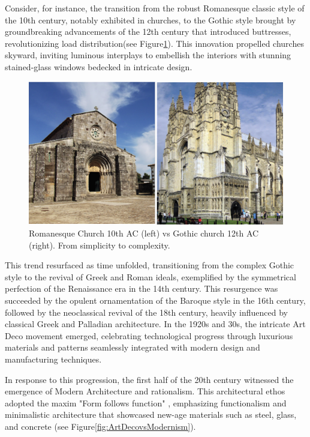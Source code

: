 Consider, for instance, the transition from the robust Romanesque classic style of the 10th century, notably exhibited in churches, to the Gothic style brought by groundbreaking advancements of the 12th century that introduced buttresses, revolutionizing load distribution\cite{Arora2023}(see Figure\ref{fig:RomanesquevsGothic}).
This innovation propelled churches skyward, inviting luminous interplays to embellish the interiors with stunning stained-glass windows bedecked in intricate design\cite{Stacbond2020}.

     \begin{figure}[htb]
          \centering
          \includegraphics[width= \linewidth]{Images/RomanesqueVsGothic}
          \caption{Romanesque Church 10th AC (left) vs Gothic church 12th AC (right). From simplicity to complexity.}
          \label{fig:RomanesquevsGothic}
        \end{figure}

This trend resurfaced as time unfolded, transitioning from the complex Gothic style to the revival of Greek and Roman ideals, exemplified by the symmetrical perfection of the Renaissance era in the 14th century. This resurgence was succeeded by the opulent ornamentation of the Baroque style in the 16th century, followed by the neoclassical revival of the 18th century, heavily influenced by classical Greek and Palladian architecture. In the 1920s and 30s, the intricate Art Deco movement emerged, celebrating technological progress through luxurious materials and patterns seamlessly integrated with modern design and manufacturing techniques.

In response to this progression, the first half of the 20th century witnessed the emergence of Modern Architecture and rationalism. This architectural ethos adopted the maxim "Form follows function" \cite{Gage2015}, emphasizing functionalism and minimalistic architecture that showcased new-age materials such as steel, glass, and concrete \cite{Arora2023}(see Figure\ref{fig:ArtDecovsModernism}).


